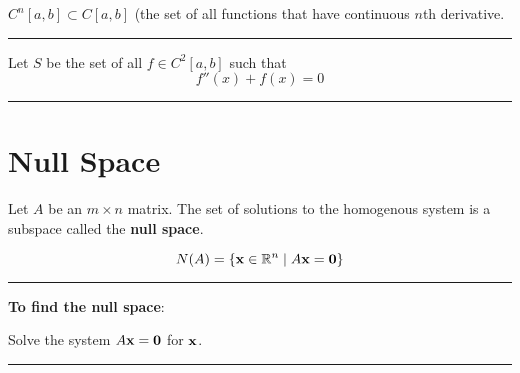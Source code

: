  

\begin{example}
$C^n[a,b] \subset C[a,b]$ (the set of all  functions that have continuous $n$th derivative.
 \end{example}
	
	 
\rule[0.01in]{\textwidth}{0.0025in}








\begin{example}
Let $S$  be the set of all $f \in C^2[a,b]$ such that 
\[  f''(x) +f(x) = 0 \]

 \end{example}
	
	 
\rule[0.01in]{\textwidth}{0.0025in}


 


  
  
  
  
  
  
  \section*{Null Space}
  
  
  \begin{definition}
Let $A$ be an $m \times n$ matrix.  The set of solutions to the homogenous system is a subspace called the \textbf{null space}.



	\begin{tcolorbox}[colback=yellow!10!,colframe=gray!15!]

\[  N(A) = \{ {\bf x} \in \mathbb{R}^n \; | \;  A{\bf x} = {\bf 0}  \} \]
	 
	\end{tcolorbox}
	
\end{definition}
	
\rule[0.01in]{\textwidth}{0.0025in}

\textbf{To find the null space}:

Solve the system $A{\bf x} = {\bf 0} $ for ${\bf x}$.

\rule[0.01in]{\textwidth}{0.0025in}






